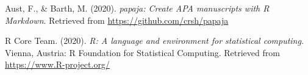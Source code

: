 \documentclass[
  english,
  man,floatsintext]{apa6}
\begin{document}
\begingroup
\setlength{\parindent}{-0.5in}
\setlength{\leftskip}{0.5in}

\hypertarget{refs}{}
\leavevmode\hypertarget{ref-R-papaja}{}%
Aust, F., \& Barth, M. (2020). \emph{papaja: Create APA manuscripts with R Markdown}. Retrieved from \url{https://github.com/crsh/papaja}

\leavevmode\hypertarget{ref-R-base}{}%
R Core Team. (2020). \emph{R: A language and environment for statistical computing}. Vienna, Austria: R Foundation for Statistical Computing. Retrieved from \url{https://www.R-project.org/}

\endgroup


\clearpage
\renewcommand{\listfigurename}{Figure captions}

\clearpage
\renewcommand{\listtablename}{Table captions}
\end{document}
